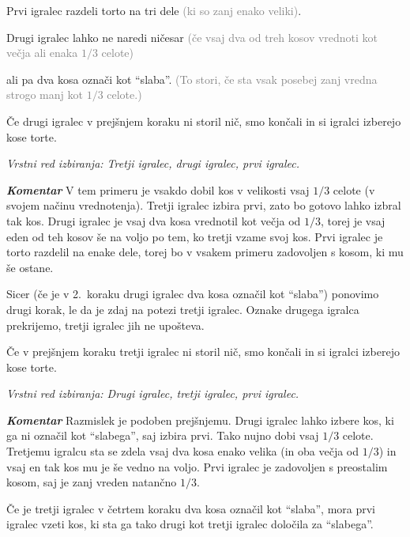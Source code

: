 \documentclass[a4paper,12pt]{article}
\begin{document}
\begin{protokol}

\item Prvi igralec razdeli torto na tri dele \textcolor{gray}{(ki so zanj enako veliki)}.

\item Drugi igralec lahko ne naredi ničesar \textcolor{gray}{(če vsaj dva od treh kosov vrednoti kot večja ali enaka $1/3$ celote)}

ali pa dva kosa označi kot ``slaba''. \textcolor{gray}{(To stori, če sta vsak posebej zanj vredna strogo manj kot $1/3$ celote.)}

\item Če drugi igralec v prejšnjem koraku ni storil nič, smo končali in si igralci izberejo kose torte.

\textsl{Vrstni red izbiranja: Tretji igralec, drugi igralec, prvi igralec.}

\item [\textbf { \em Komentar}] V tem primeru je vsakdo dobil kos v velikosti vsaj  $1/3$ celote (v svojem načinu vrednotenja). Tretji igralec izbira prvi, zato bo gotovo lahko izbral tak kos. Drugi igralec je vsaj dva kosa vrednotil kot večja od  $1/3$, torej je vsaj eden od teh kosov še na voljo po tem, ko tretji vzame svoj kos. Prvi igralec je torto razdelil na enake dele, torej bo v vsakem primeru zadovoljen s kosom, ki mu še ostane.

\item Sicer (če je v 2.~koraku drugi igralec dva kosa označil kot ``slaba'') ponovimo drugi korak, le da je zdaj na potezi tretji igralec. Oznake drugega igralca prekrijemo, tretji igralec jih ne upošteva.

\item Če v prejšnjem koraku tretji igralec ni storil nič, smo končali in si igralci izberejo kose torte.

\textsl{Vrstni red izbiranja: Drugi igralec, tretji igralec, prvi igralec.}

\item [\textbf{\em Komentar}] Razmislek je podoben prejšnjemu. Drugi igralec lahko izbere kos, ki ga ni označil kot ``slabega'', saj izbira prvi. Tako nujno dobi vsaj $1/3$ celote. Tretjemu igralcu sta se zdela vsaj dva kosa enako velika (in oba večja od $1/3$) in vsaj en tak kos mu je še vedno na voljo. Prvi igralec je zadovoljen s preostalim kosom, saj je zanj vreden natančno $1/3$.

\item Če je tretji igralec v četrtem koraku dva kosa označil kot ``slaba'', mora prvi igralec vzeti kos, ki sta ga tako drugi kot tretji igralec določila za ``slabega''.


\end{protokol}
\end{document}
